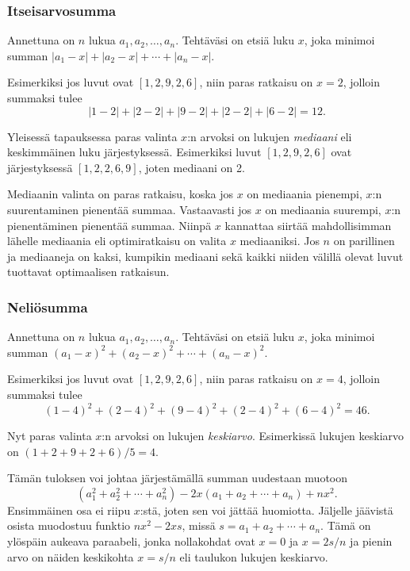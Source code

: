 \subsubsection{Itseisarvosumma}

\begin{task}
Annettuna on $n$ lukua $a_1,a_2,\ldots,a_n$.
Tehtäväsi on etsiä luku $x$, joka minimoi summan
$|a_1-x|+|a_2-x|+\cdots+|a_n-x|.$
\end{task}

Esimerkiksi jos luvut ovat $[1,2,9,2,6]$,
niin paras ratkaisu on $x=2$,
jolloin summaksi tulee
\[
|1-2|+|2-2|+|9-2|+|2-2|+|6-2|=12.
\]

Yleisessä tapauksessa paras valinta $x$:n arvoksi
on lukujen \textit{mediaani}
eli keskimmäinen luku järjestyksessä.
Esimerkiksi luvut $[1,2,9,2,6]$
ovat järjestyksessä $[1,2,2,6,9]$,
joten mediaani on 2.

Mediaanin valinta on paras ratkaisu,
koska jos $x$ on mediaania pienempi,
$x$:n suurentaminen pienentää summaa.
Vastaavasti jos $x$ on mediaania suurempi,
$x$:n pienentäminen pienentää summaa.
Niinpä $x$ kannattaa siirtää mahdollisimman
lähelle mediaania eli optimiratkaisu on
valita $x$ mediaaniksi.
Jos $n$ on parillinen ja mediaaneja on kaksi,
kumpikin mediaani sekä kaikki niiden välillä
olevat luvut tuottavat optimaalisen ratkaisun.

\subsubsection{Neliösumma}

\begin{task}
Annettuna on $n$ lukua $a_1,a_2,\ldots,a_n$.
Tehtäväsi on etsiä luku $x$, joka minimoi summan
$(a_1-x)^2+(a_2-x)^2+\cdots+(a_n-x)^2.$
\end{task}

Esimerkiksi jos luvut ovat $[1,2,9,2,6]$,
niin paras ratkaisu on $x=4$,
jolloin summaksi tulee
\[
(1-4)^2+(2-4)^2+(9-4)^2+(2-4)^2+(6-4)^2=46.
\]

Nyt paras valinta $x$:n arvoksi on lukujen
\textit{keskiarvo}.
Esimerkissä lukujen keskiarvo on $(1+2+9+2+6)/5=4$.

Tämän tuloksen voi johtaa järjestämällä summan
uudestaan muotoon
\[
(a_1^2+a_2^2+\cdots+a_n^2)-2x(a_1+a_2+\cdots+a_n)+nx^2.
\]
Ensimmäinen osa ei riipu $x$:stä, joten sen voi jättää huomiotta.
Jäljelle jäävistä osista muodostuu funktio
$nx^2-2xs$, missä $s=a_1+a_2+\cdots+a_n$.
Tämä on ylöspäin aukeava paraabeli,
jonka nollakohdat ovat $x=0$ ja $x=2s/n$
ja pienin arvo on näiden keskikohta
$x=s/n$ eli taulukon lukujen keskiarvo.

